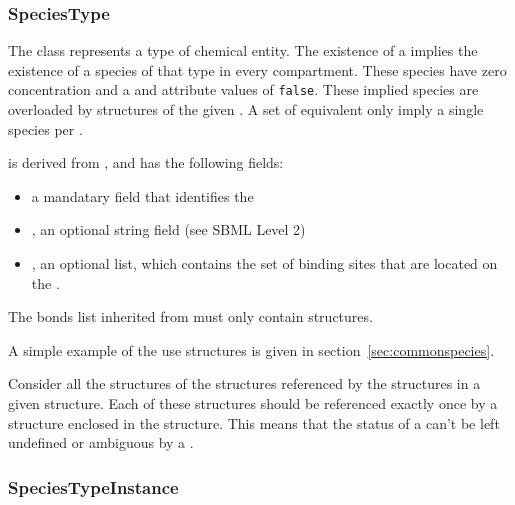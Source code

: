 \documentclass{cekarticle}
\begin{document}
\subsubsection{SpeciesType}

\label{sec:class-speciestype}

The class  represents a type of chemical
entity. The existence of a  implies the
existence of a species of that type in every compartment. These
species have zero concentration and a  and
 attribute values of \texttt{false}. These
implied species are overloaded by  structures of
the given .  A set of equivalent
 only imply a single species per
.

 is derived from , and has
the following fields:

\begin{itemize}

\item {} a mandatary  field that identifies the 

\item {}, an optional string field (see SBML Level 2)

\item {}, an optional  list, which contains the set of binding
sites that are located on the .

\end{itemize}

The bonds list inherited from  must only
contain  structures.

A simple example of the use  structures is given in section~\ref{sec:commonspecies}.

Consider all the  structures of the
 structures referenced by the
 structures in a given
 structure. Each of these 
structures should be referenced exactly once by a
 structure enclosed in the
 structure.  This means that the status of a
 can't be left undefined or ambiguous by a
.

\subsubsection{SpeciesTypeInstance}
\end{document}
